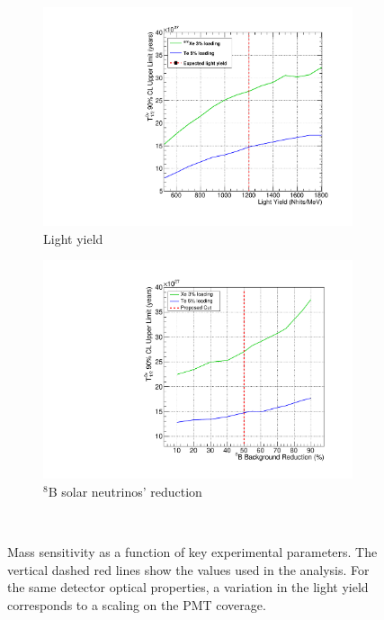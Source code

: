 \begin{figure}
\centering
\begin{subfigure}[b]{0.35\textwidth}
 \includegraphics[width=\textwidth]{dbd/ly_comparison_lifetime_500.pdf}
 \caption{Light yield}
 \label{fig:scale-ly}
\end{subfigure}
\begin{subfigure}[b]{0.35\textwidth}
 \includegraphics[width=\textwidth]{dbd/b8_reduction_fc.pdf}
 \caption{$^8$B solar neutrinos' reduction}
 \label{fig:scale-b8}
\end{subfigure}\\
\caption{Mass sensitivity as a function of key experimental parameters. The vertical dashed red lines show the values used in the analysis. For the same detector optical properties, a variation in the light yield corresponds to a scaling on the PMT coverage.}
\label{fig:scaling-plots}
\end{figure}

